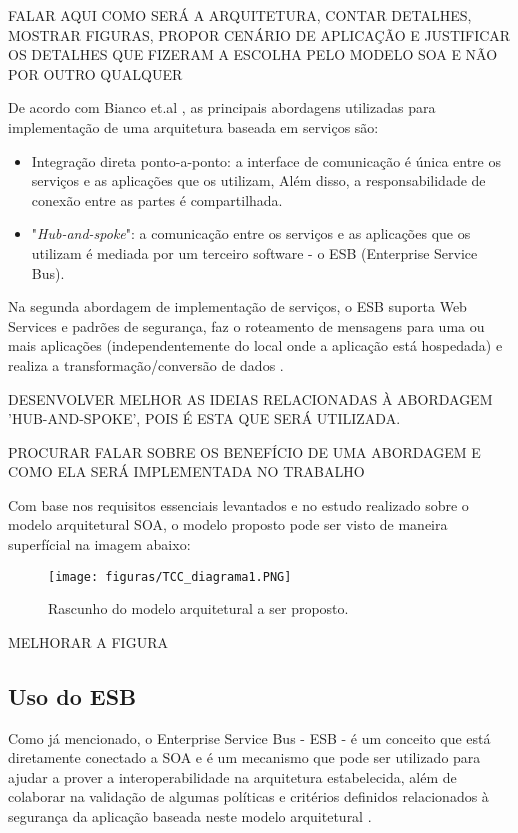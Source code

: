 {FALAR AQUI COMO SERÁ A ARQUITETURA, CONTAR DETALHES, MOSTRAR FIGURAS, PROPOR CENÁRIO DE APLICAÇÃO E JUSTIFICAR OS DETALHES QUE FIZERAM A ESCOLHA PELO MODELO SOA E NÃO POR OUTRO QUALQUER}

De acordo com Bianco et.al \cite{BiancoEvaluatinga2007}, as principais abordagens utilizadas para implementação de uma arquitetura baseada em serviços são:
\begin{itemize}
\item Integração direta ponto-a-ponto: a interface de comunicação é única entre os serviços e as aplicações que os utilizam, Além disso, a responsabilidade de conexão entre as partes é compartilhada.
\item "\textit{Hub-and-spoke}": a comunicação entre os serviços e as aplicações que os utilizam é mediada por um terceiro software - o ESB (Enterprise Service Bus).
\end{itemize}

Na segunda abordagem de implementação de serviços, o ESB suporta Web Services e padrões de segurança, faz o roteamento de mensagens para uma ou mais aplicações (independentemente do local onde a aplicação está hospedada) e realiza a transformação/conversão de dados \cite{BiancoEvaluatinga2007}.


{{DESENVOLVER MELHOR AS IDEIAS RELACIONADAS À ABORDAGEM 'HUB-AND-SPOKE', POIS É ESTA QUE SERÁ UTILIZADA. 

PROCURAR FALAR SOBRE OS BENEFÍCIO DE UMA ABORDAGEM E COMO ELA SERÁ IMPLEMENTADA NO TRABALHO}}


Com base nos requisitos essenciais levantados e no estudo realizado sobre o modelo arquitetural SOA, o modelo proposto pode ser visto de maneira superfícial na imagem abaixo:

\begin{figure}[htb]
\centering
\texttt{[image: figuras/TCC\_diagrama1.PNG]}
\caption{Rascunho do modelo arquitetural a ser proposto.}
\label{TCC_diagrama1}
\end{figure}

{MELHORAR A FIGURA}


\subsection{Uso do ESB}

Como já mencionado, o Enterprise Service Bus - ESB - é um conceito que está diretamente conectado a SOA e é um mecanismo que pode ser utilizado para ajudar a prover a interoperabilidade na arquitetura estabelecida, além de colaborar na validação de algumas políticas e critérios definidos relacionados à segurança da aplicação baseada neste modelo arquitetural \cite{oliveira_interoperabilidade}.

